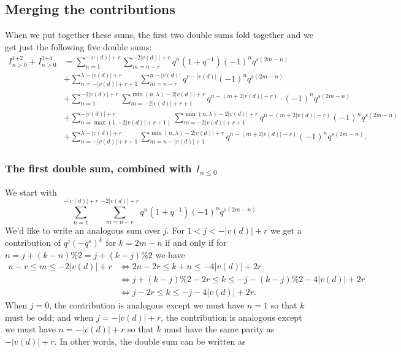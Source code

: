 \subsection{Merging the contributions}
When we put together these sums, the first two double sums fold together and
we get just the following five double sums:
\begin{align*}
  I_{n>0}^{\text{1+2}} + I_{n>0}^{\text{3+4}}
  &= \sum_{n=1}^{-|v(d)|+r} \sum_{m=n-r}^{-2|v(d)|+r}
    q^{n} \left( 1 + q^{-1} \right) (-1)^n q^{s(2m-n)} \\
  &+ \sum_{n=-|v(d)|+r+1}^{\lambda-|v(d)|+r}
    \sum_{m=n-r}^{n-|v(d)|} q^{r-|v(d)|} (-1)^n q^{s(2m-n)} \\
  &+ \sum_{n=1}^{-2|v(d)|+r}
    \sum_{m=-2|v(d)|+r+1}^{\min\left(n, \lambda\right) - 2|v(d)|+r}
    q^{n - (m+2|v(d)|-r)} \cdot (-1)^n q^{s(2m-n)} \\
  &+ \sum_{n=\max(1, -2|v(d)|+r+1)}^{-|v(d)|+r}
    \sum_{m=-2|v(d)|+r+1}^{\min(n, \lambda) - 2|v(d)| + r}
    q^{n-(m+2|v(d)|-r)} (-1)^n q^{s(2m-n)} \\
  &+ \sum_{n=-|v(d)|+r+1}^{\lambda-|v(d)|+r}
    \sum_{m=n-|v(d)|+1}^{\min(n, \lambda) - 2|v(d)| + r}
    q^{n - (m+2|v(d)|-r)} (-1)^n q^{s(2m-n)}.
\end{align*}

\subsubsection{The first double sum, combined with $I_{n \le 0}$}
We start with
\[ \sum_{n=1}^{-|v(d)|+r} \sum_{m=n-r}^{-2|v(d)|+r} q^{n} \left( 1 + q^{-1} \right) (-1)^n q^{s(2m-n)} \]
We'd like to write an analogous sum over $j$.
For $1 < j < -|v(d)|+r$ we get a contribution of $q^j (-q^s)^k$ for $k = 2m-n$ if and only if
for $n = j + (k-n)\%2 = j + (k-j) \% 2$ we have
\begin{align*}
  n-r \le m \le -2|v(d)|+r
  &\iff 2n-2r \le k+n \le -4|v(d)|+2r \\
  &\iff j + (k-j)\%2 - 2r \le k \le -j - (k-j)\%2 - 4|v(d)| + 2r \\
  &\iff j - 2r \le k \le -j - 4|v(d)| + 2r.
\end{align*}
When $j=0$, the contribution is analogous except we must have $n=1$ so that $k$ must be odd;
and when $j=-|v(d)|+r$, the contribution is analogous except we must have $n=-|v(d)|+r$
so that $k$ must have the same parity as $-|v(d)|+r$.
In other words, the double sum can be written as

